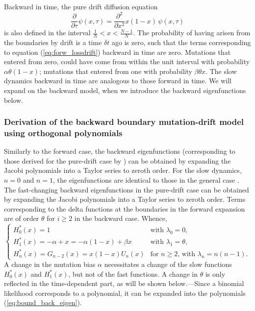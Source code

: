 \documentclass[preprint]{elsarticle}
\begin{document}
{Backward in time, the pure drift diffusion equation
\begin{equation}\label{eq:backw_drift}
  \frac{\partial}{\partial \tau} \psi(x,\tau) =\frac{\partial^2}{\partial x^2}x(1-x)\,\psi(x,\tau) 
\end{equation}
is also defined in the interval $\frac1N<x<\frac{N-1}N$. The probability of having arisen from the boundaries by drift is a time $\delta t$ ago is zero, such that the terms corresponding to equation (\ref{eq:forw_lossdrift}) backward in time are zero. Mutations that entered from zero, could have come from within the unit interval with probability $\alpha\theta(1-x)$; mutations that entered from one with probability $\beta\theta x$. The slow dynamics backward in time are analogous to those forward in time. We will expand on the backward model, when we introduce the backward eigenfunctions below.

\subsubsection{Derivation of the backward boundary mutation-drift model using orthogonal polynomials}

Similarly to the forward case, the backward eigenfunctions (corresponding to those derived for the pure-drift case by \citet{Song12}) can be obtained by expanding the Jacobi polynomials into a Taylor series to zeroth order. For the slow dynamics, $n=0$ and $n=1$, the eigenfunctions are identical to those in the general case \citep{Song12}. The fast-changing backward eigenfunctions in the pure-drift case \citep{Song12} can be obtained by expanding the Jacobi polynomials into a Taylor series to zeroth order. Terms corresponding to the delta functions at the boundaries in the forward expansion are of order $\theta$ for $i\geq 2$ in the backward case. Whence,
\begin{equation}\label{eq:bound_back_eigen}
    \begin{cases}
    H_0^{*}(x)= 1 &\text{with $\lambda_0=0$,}\\
    H_1^{*}(x)=-\alpha+x=-\alpha(1- x) +\beta x &\text{with $\lambda_1=\theta$,}\\
    H_n^{*}(x)= G_{n-2}(x)=x(1-x)U_n(x) &\text{for $n\geq2$, with $\lambda_n=n(n-1)$.}
    \end{cases}
\end{equation}
A change in the mutation bias $\alpha$ necessitates a change of the slow functions $H_0^{*}(x)$ and $H_1^{*}(x)$, but not of the fast functions. A change in $\theta$ is only reflected in the time-dependent part, as will be shown below.---Since a binomial likelihood corresponds to a polynomial, it can be expanded into the polynomials (\ref{eq:bound_back_eigen}).

}
\end{document}
